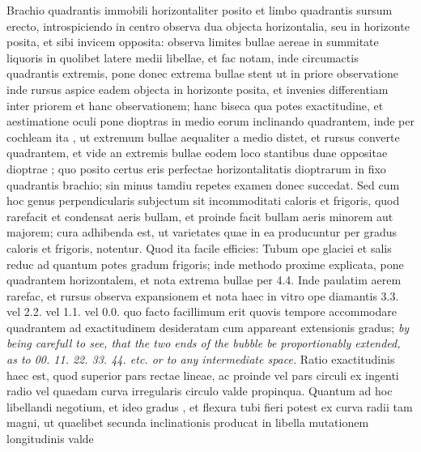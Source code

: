 \pstart Brachio quadrantis\protect{} immobili horizontaliter posito et limbo quadrantis\protect{} sursum erecto, introspiciendo in centro observa dua objecta horizontalia, seu in horizonte posita, et sibi invicem opposita: observa limites bullae aereae in summitate liquoris in quolibet latere medii libellae, et fac notam, inde circumactis quadrantis\protect{} extremis, pone donec extrema bullae stent ut in priore observatione inde rursus aspice eadem objecta in horizonte posita, et invenies differentiam inter priorem et hanc observationem; hanc biseca qua potes exactitudine, et aestimatione oculi pone dioptras\protect{} in medio eorum inclinando quadrantem\protect{}, inde per cochleam ita , ut extremum bullae aequaliter a medio distet, et rursus converte quadrantem\protect{}, et vide an extremis bullae eodem loco stantibus duae oppositae dioptrae\protect{} ; quo posito certus eris perfectae horizontalitatis dioptrarum\protect{} in fixo quadrantis\protect{} brachio; sin minus tamdiu repetes examen donec succedat. Sed cum hoc genus perpendicularis subjectum sit incommoditati caloris et frigoris, quod rarefacit et condensat aeris bullam, et proinde facit bullam aeris minorem aut majorem; cura adhibenda est, ut varietates quae in ea producuntur per gradus caloris et frigoris, notentur. Quod ita facile efficies: Tubum ope glaciei et salis reduc ad quantum potes gradum frigoris; inde methodo proxime explicata, pone quadrantem\protect{} horizontalem, et nota extrema bullae per 4.4. Inde paulatim aerem rarefac, et rursus observa expansionem et nota haec in vitro ope diamantis 3.3. vel 2.2. vel 1.1. vel 0.0. quo facto facillimum erit quovis tempore accommodare quadrantem\protect{} ad exactitudinem desideratam cum appareant extensionis gradus; \textit{by being carefull to see, that the two ends of the bubble be proportionably extended, as to 00. 11. 22. 33. 44. etc. or to any intermediate space.} Ratio exactitudinis haec est, quod superior pars  rectae lineae, ac proinde vel pars circuli ex ingenti radio vel quaedam curva irregularis circulo valde propinqua. Quantum ad hoc libellandi negotium, et ideo gradus  , et flexura tubi fieri potest ex curva radii tam magni, ut quaelibet secunda inclinationis producat in libella mutationem longitudinis valde 